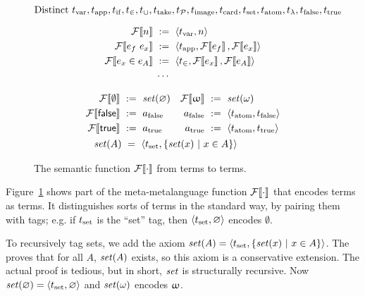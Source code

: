 \begin{figure*}[tb]\centering
\begin{equation*}
\text{Distinct }\tvar,\tapp,\tif,\tin,\tunion,\ttake,\tpowerset,\timage,\torder,\tset,\tatom,\tfun,\tfalse,\ttrue \vspace{-\baselineskip}
\end{equation*}
\begin{varwidth}[t]{\textwidth}
\begin{equation*}
\begin{aligned}
	\mathcal{F}\!\left\llbracket{n}\right\rrbracket &\ :=\ \langle{t_\mathrm{var},n}\rangle \\
	\mathcal{F}\!\left\llbracket{{e_f}\ {e_x}}\right\rrbracket &\ :=\ \langle{t_\mathrm{app},\mathcal{F}\!\left\llbracket{e_f}\right\rrbracket,\mathcal{F}\!\left\llbracket{e_x}\right\rrbracket}\rangle \\
	\mathcal{F}\!\left\llbracket{e_x \in e_A}\right\rrbracket &\ :=\ \langle{t_\in,\mathcal{F}\!\left\llbracket{e_x}\right\rrbracket,\mathcal{F}\!\left\llbracket{e_A}\right\rrbracket}\rangle \\
	&\;\cdots
\end{aligned}
\end{equation*}
\end{varwidth}
\hspace{0.09in}
%
\begin{varwidth}[t]{\textwidth}
\begin{equation*}
\begin{aligned}
&\begin{aligned}
	\enc{\lemptyset} &\ \metadef\ \encset(\emptyset) &
\enc{\lnat} &\ \metadef\ \encset(\omega) \\
	\enc{\lfalse} &\ \metadef\ \afalse &
\afalse &\ \metadef\ \pair{\tatom,\tfalse} \\
	\enc{\ltrue} &\ \metadef\ \atrue &
\atrue &\ \metadef\ \pair{\tatom,\ttrue}
\end{aligned} \\
	&\ \ \,\encset(A) \ =\ \pair{\tset, \setb{\encset(x)}{x \in A}}
\end{aligned}
\end{equation*}
\end{varwidth}
\bottomhrule
\caption[Semantic function $\enc{\cdot}$]{The semantic function $\enc{\cdot}$ from \ftargetlang terms to \targetlang terms.}
\label{fig:encoding}
\end{figure*}

Figure~\ref{fig:encoding} shows part of the meta-metalanguage function $\mathcal{F}\!\left\llbracket{\cdot}\right\rrbracket$ that encodes \ftargetlang terms as \targetlang terms. It distinguishes sorts of terms in the standard way, by pairing them with tags; e.g. if $t_\mathrm{set}$ is the ``set'' tag, then $\langle{t_\mathrm{set},\varnothing}\rangle$ encodes $\emptyset$.

To recursively tag sets, we add the axiom $\mathit{set}(A) = \langle{t_\mathrm{set}, \lbrace {\mathit{set}(x)} \ \lvert\ {x \in A} \rbrace}\rangle$. The  proves that for all $A$, $\mathit{set}(A)$ exists, so this axiom is a conservative extension. The actual proof is tedious, but in short, $\mathit{set}$ is structurally recursive. Now $\mathit{set}(\varnothing) = \langle{t_\mathrm{set},\varnothing}\rangle$ and $\mathit{set}(\omega)$ encodes $\upomega$.

